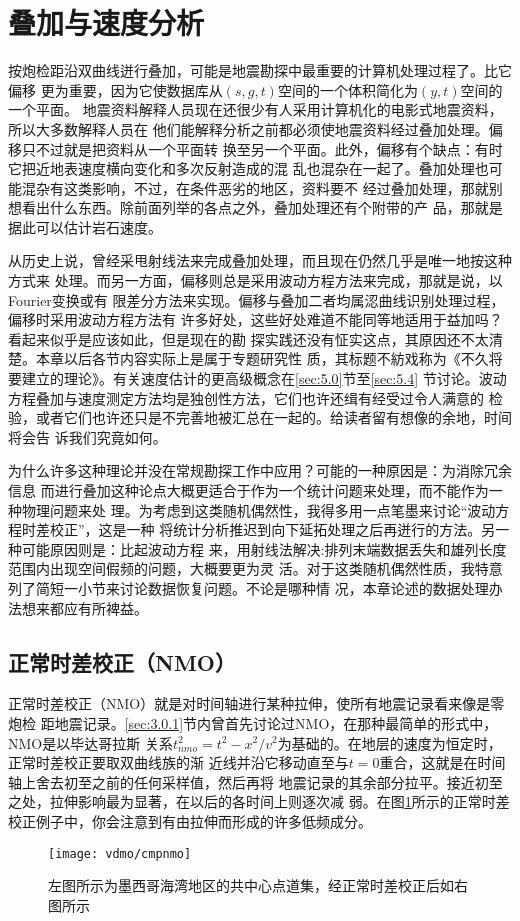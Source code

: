 \section{叠加与速度分析}
\label{sec:3.5}

按炮检距沿双曲线迸行叠加，可能是地震勘探中最重要的计算机处理过程了。比它偏移
更为重要，因为它使数据库从$(s, g, t)$空间的一个体积简化为$(y, t)$空间的一个平面。
地震资料解释人员现在还很少有人采用计算机化的电影式地震资料，所以大多数解释人员在
他们能解释分析之前都必须使地震资料经过叠加处理。偏移只不过就是把资料从一个平面转
换至另一个平面。此外，偏移有个缺点：有时它把近地表速度横向变化和多次反射造成的混
乱也混杂在一起了。叠加处理也可能混杂有这类影响，不过，在条件恶劣的地区，资料要不
经过叠加处理，那就别想看出什么东西。除前面列举的各点之外，叠加处理还有个附带的产
品，那就是据此可以估计岩石速度。

从历史上说，曾经采甩射线法来完成叠加处理，而且现在仍然几乎是唯一地按这种方式来
处理。而另一方面，偏移则总是采用波动方程方法来完成，那就是说，以Fourier变换或有
限差分方法来实现。偏移与叠加二者均属涊曲线识别处理过程，偏移时采用波动方程方法有
许多好处，这些好处难道不能同等地适用于益加吗？看起来似乎是应该如此，但是现在的勘
探实践还没有怔实这点，其原因还不太清楚。本章以后各节内容实际上是属于专题研究性
质，其标题不紡戏称为《不久将要建立的理论》。有关速度估计的更高级概念在\ref{sec:5.0}节至\ref{sec:5.4}
节讨论。波动方程叠加与速度测定方法均是独创性方法，它们也许还缉有经受过令人满意的
检验，或者它们也许还只是不完善地被汇总在一起的。给读者留有想像的余地，时间将会告
诉我们究竟如何。

为什么许多这种理论并没在常规勘探工作中应用？可能的一种原因是：为消除冗余信息
而进行叠加这种论点大概更适合于作为一个统计问题来处理，而不能作为一种物理问题来处
理。为考虑到这类随机偶然性，我得多用一点笔墨来讨论“波动方程时差校正”，这是一种
将统计分析推迟到向下延拓处理之后再迸行的方法。另一种可能原因则是：比起波动方程
来，用射线法解决:排列末端数据丢失和雄列长度范围内出现空间假频的问题，大概要更为灵
活。对于这类随机偶然性质，我特意列了简短一小节来讨论数据恢复问题。不论是哪种情
况，本章论述的数据处理办法想来都应有所裨益。

\subsection{正常时差校正（NMO）}
\label{sec:3.5.1}

正常时差校正（NMO）就是对时间轴进行某种拉伸，使所有地震记录看来像是零炮检
距地震记录。\ref{sec:3.0.1}节内曾首先讨论过NMO，在那种最简单的形式中，NMO是以毕达哥拉斯
关系$t_{nmo}^2=t^2-x^2/v^2$为基础的。在地层的速度为恒定时，正常时差校正要取双曲线族的渐
近线并沿它移动直至与$t=0$重合，这就是在时间轴上舍去初至之前的任何采样值，然后再将
地震记录的其余部分拉平。接近初至之处，拉伸影响最为显著，在以后的各时间上则逐次减
弱。在图\ref{fig:vdmo/cmpnmo}所示的正常时差校正例子中，你会注意到有由拉伸而形成的许多低频成分。
\begin{figure}[H]
\centering
\texttt{[image: vdmo/cmpnmo]}
\caption[cmpnmo]{左图所示为墨西哥海湾地区的共中心点道集，经正常时差校正后如右图所示}
\label{fig:vdmo/cmpnmo}
\end{figure}

